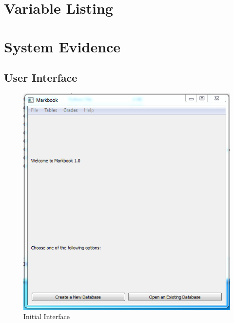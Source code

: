 \section{Variable Listing}
\section{System Evidence}

\subsection{User Interface}
\begin{figure}[H]   \includegraphics[width=\textwidth]{./Images/Initial Interface.png}
    \caption{Initial Interface} \label{}
\end{figure}

